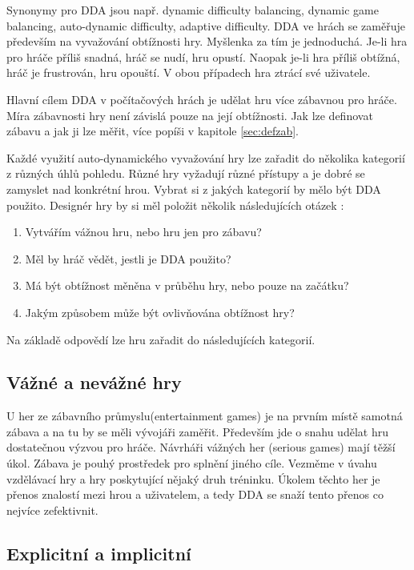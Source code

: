 Synonymy pro DDA jsou např. dynamic difficulty balancing, dynamic game balancing, auto-dynamic difficulty, adaptive difficulty. DDA ve hrách se zaměřuje především na vyvažování obtížnosti hry. Myšlenka za tím je jednoduchá. Je-li hra pro hráče příliš snadná, hráč se nudí, hru opustí. Naopak je-li hra příliš obtížná, hráč je frustrován, hru opouští. V obou případech hra ztrácí své uživatele.

Hlavní cílem DDA v počítačových hrách je udělat hru více zábavnou pro hráče. Míra zábavnosti hry není závislá pouze na její obtížnosti. Jak lze definovat zábavu a jak ji lze měřit, více popíši v kapitole \ref{sec:defzab}. 

Každé využití auto-dynamického vyvažování hry lze zařadit do několika kategorií z různých úhlů pohledu. Různé hry vyžadují různé přístupy a je dobré se zamyslet nad konkrétní hrou. Vybrat si z jakých kategorií by mělo být DDA použito. Designér hry by si měl položit několik následujících otázek :

\begin{enumerate}
  \item Vytvářím vážnou hru, nebo hru jen pro zábavu?
	\item Měl by hráč vědět, jestli je DDA použito?
	\item Má být obtížnost měněna v průběhu hry, nebo pouze na začátku?
	\item Jakým způsobem může být ovlivňována obtížnost hry?
\end{enumerate}

Na základě odpovědí lze hru zařadit do následujících kategorií.

\subsection{Vážné a nevážné hry}

U her ze zábavního průmyslu(entertainment games) je na prvním místě samotná zábava a na tu by se měli vývojáři zaměřit. Především jde o snahu udělat hru dostatečnou výzvou pro hráče. Návrháři vážných her (serious games) mají těžší úkol. Zábava je pouhý prostředek pro splnění jiného cíle. Vezměme v úvahu vzdělávací hry a hry poskytující nějaký druh tréninku. Úkolem těchto her je přenos znalostí mezi hrou a uživatelem, a tedy DDA se snaží tento přenos co nejvíce zefektivnit\cite{16Survey}. 

\subsection{Explicitní a implicitní}

